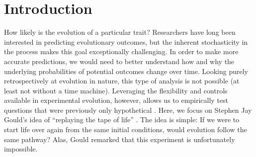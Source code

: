\section{Introduction}

How likely is the evolution of a particular trait?
Researchers have long been interested in predicting evolutionary outcomes, but the inherent stochasticity in the process makes this goal exceptionally challenging.
In order to make more accurate predictions, we would need to better understand how and why the underlying probabilities of potential outcomes change over time.
Looking purely retrospectively at evolution in nature, this type of analysis is not possible (at least not without a time machine).
Leveraging the flexibility and controls available in experimental evolution, however, allows us to empirically test questions that were previously only hypothetical \citep{kaweckiExperimentalEvolution2012}. 
Here, we focus on Stephen Jay Gould's idea of ``replaying the tape of life'' \citep{gouldWonderfulLifeBurgess1990}.
The idea is simple: If we were to start life over again from the same initial conditions, would evolution follow the same pathway?
Alas, Gould remarked that this experiment is unfortunately impossible. 

